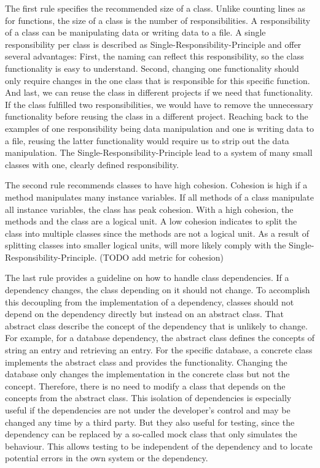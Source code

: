 The first rule specifies the recommended size of a class. Unlike counting lines as for functions, the size of a class is the number of responsibilities. A responsibility of a class can be manipulating data or writing data to a file. A single responsibility per class is described as Single-Responsibility-Principle and offer several advantages: First, the naming can reflect this responsibility, so the class functionality is easy to understand.
Second, changing one functionality should only require changes in the one class that is responsible for this specific function. And last, we can reuse the class in different projects if we need that functionality. If the class fulfilled two responsibilities, we would have to remove the unnecessary functionality before reusing the class in a different project. Reaching back to the examples of one responsibility being data manipulation and one is writing data to a file, reusing the latter functionality would require us to strip out the data manipulation.
The Single-Responsibility-Principle lead to a system of many small classes with one, clearly defined responsibility.

The second rule recommends classes to have high cohesion. Cohesion is high if a method manipulates many instance variables. If all methods of a class manipulate all instance variables, the class has peak cohesion. With a high cohesion, the methods and the class are a logical unit. A low cohesion indicates to split the class into multiple classes since the methods are not a logical unit. As a result of splitting classes into smaller logical units, will more likely comply with the Single-Responsibility-Principle. (TODO add metric for cohesion)

The last rule provides a guideline on how to handle class dependencies. If a dependency changes, the class depending on it should not change. To accomplish this decoupling from the implementation of a dependency, classes should not depend on the dependency directly but instead on an abstract class. That abstract class describe the concept of the dependency that is unlikely to change. For example, for a database dependency, the abstract class defines the concepts of string an entry and retrieving an entry. For the specific database, a concrete class implements the abstract class and provides the functionality. Changing the database only changes the implementation in the concrete class but not the concept. Therefore, there is no need to modify a class that depends on the concepts from the abstract class. This isolation of dependencies is especially useful if the dependencies are not under the developer's control and may be changed any time by a third party. But they also useful for testing, since the dependency can be replaced by a so-called mock class that only simulates the behaviour. This allows testing to be independent of the dependency and to locate potential errors in the own system or the dependency.

